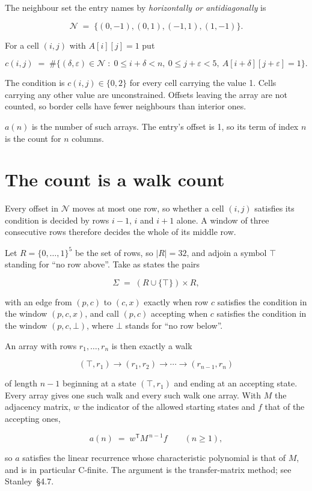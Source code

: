 \documentclass[11pt]{article}
\theoremstyle{definition}
\begin{document}
The neighbour set the entry names by {\itshape horizontally or antidiagonally} is

\[\mathcal{N} \;=\; \{(0,-1), (0,1), (-1,1), (1,-1)\}.\]

For a cell $(i,j)$ with $A[i][j] = 1$ put

\[c(i,j) \;=\; \#\bigl\{(\delta,\varepsilon)\in\mathcal{N} \;:\; 0\le i+\delta<n,\ 0\le j+\varepsilon<5,\ A[i+\delta][j+\varepsilon] = 1\bigr\}.\]

The condition is $c(i,j) \in \{0, 2\}$ for every cell carrying the value 1. Cells carrying any other value are unconstrained. Offsets leaving the array are not counted, so border cells have fewer neighbours than interior ones.

$a(n)$ is the number of such arrays. The entry's offset is 1, so its term of index $n$ is the count for $n$ columns.

\section{The count is a walk count}

Every offset in $\mathcal{N}$ moves at most one row, so whether a cell $(i,j)$ satisfies its condition is decided by rows $i-1$, $i$ and $i+1$ alone. A window of three consecutive rows therefore decides the whole of its middle row.

Let $R = \{0,\dots,1\}^{5}$ be the set of rows, so $|R| = 32$, and adjoin a symbol $\top$ standing for ``no row above''. Take as states the pairs

\[\Sigma \;=\; (R \cup \{\top\}) \times R,\]

with an edge from $(p,c)$ to $(c,x)$ exactly when row $c$ satisfies the condition in the window $(p,c,x)$, and call $(p,c)$ accepting when $c$ satisfies the condition in the window $(p,c,\bot)$, where $\bot$ stands for ``no row below''.

An array with rows $r_1,\dots,r_n$ is then exactly a walk

\[(\top,r_1) \to (r_1,r_2) \to \cdots \to (r_{n-1},r_n)\]

of length $n-1$ beginning at a state $(\top,r_1)$ and ending at an accepting state. Every array gives one such walk and every such walk one array. With $M$ the adjacency matrix, $w$ the indicator of the allowed starting states and $f$ that of the accepting ones,

\[a(n) \;=\; w^{\mathsf T} M^{\,n-1} f \qquad (n \ge 1),\]

so $a$ satisfies the linear recurrence whose characteristic polynomial is that of $M$, and is in particular C-finite. The argument is the transfer-matrix method; see Stanley~\S4.7.
\end{document}
